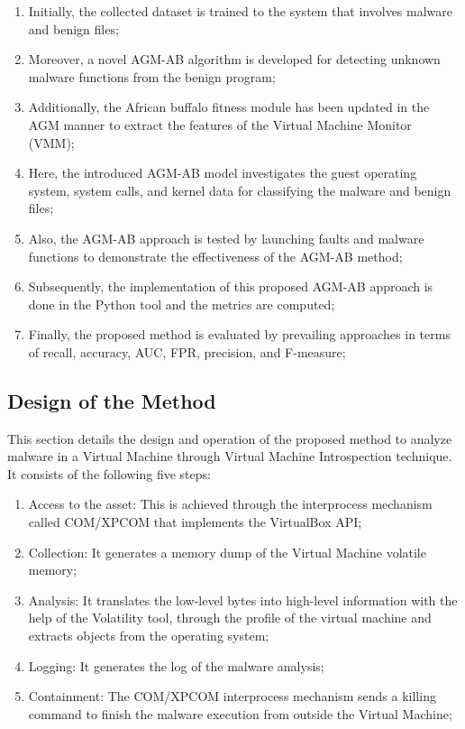 \documentclass{gji}
\begin{document}
\begin{enumerate}
\item Initially, the collected dataset is trained to the system that involves malware and benign files;
\item Moreover, a novel AGM-AB algorithm is developed for detecting unknown malware functions from the benign program;
\item Additionally, the African buffalo fitness module has been updated in the AGM manner to extract the features of the Virtual Machine Monitor (VMM);
\item Here, the introduced AGM-AB model investigates the guest operating system, system calls, and kernel data for classifying the malware and benign files;
\item Also, the AGM-AB approach is tested by launching faults and malware functions to demonstrate the effectiveness of the AGM-AB method;
\item Subsequently, the implementation of this proposed AGM-AB approach is done in the Python tool and the metrics are computed;
\item Finally, the proposed method is evaluated by prevailing approaches in terms of recall, accuracy, AUC, FPR, precision, and F-measure;
\end{enumerate}

\subsection{Design of the Method}
This section details the design and operation of the proposed method to analyze malware in a Virtual Machine through Virtual Machine Introspection technique. It consists of the following five steps: 
\begin{enumerate} 
  \item Access to the asset: This is achieved through the interprocess mechanism called COM/XPCOM that implements the VirtualBox API;
  \item Collection: It generates a memory dump of the Virtual Machine volatile memory;
  \item Analysis: It translates the low-level bytes into high-level information with the help of the Volatility tool, through the profile of the virtual machine and extracts objects from the operating system;
  \item Logging: It generates the log of the malware analysis;
  \item Containment: The COM/XPCOM interprocess mechanism sends a killing command to finish the malware execution from outside the Virtual Machine;
\end{enumerate}
\end{document}
